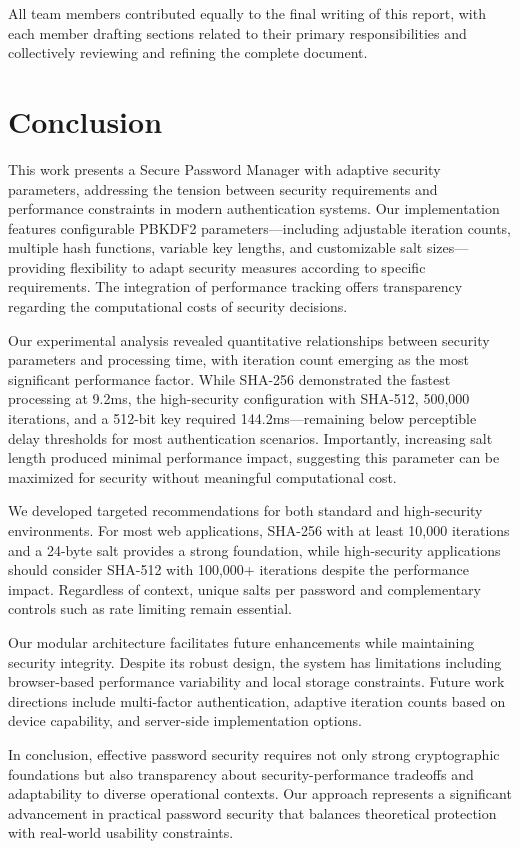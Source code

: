 \documentclass[11pt,a4paper]{article}
\begin{document}
All team members contributed equally to the final writing of this report, with each member drafting sections related to their primary responsibilities and collectively reviewing and refining the complete document.

\section{Conclusion}
This work presents a Secure Password Manager with adaptive security parameters, addressing the tension between security requirements and performance constraints in modern authentication systems. Our implementation features configurable PBKDF2 parameters—including adjustable iteration counts, multiple hash functions, variable key lengths, and customizable salt sizes—providing flexibility to adapt security measures according to specific requirements. The integration of performance tracking offers transparency regarding the computational costs of security decisions.

Our experimental analysis revealed quantitative relationships between security parameters and processing time, with iteration count emerging as the most significant performance factor. While SHA-256 demonstrated the fastest processing at 9.2ms, the high-security configuration with SHA-512, 500,000 iterations, and a 512-bit key required 144.2ms—remaining below perceptible delay thresholds for most authentication scenarios. Importantly, increasing salt length produced minimal performance impact, suggesting this parameter can be maximized for security without meaningful computational cost.

We developed targeted recommendations for both standard and high-security environments. For most web applications, SHA-256 with at least 10,000 iterations and a 24-byte salt provides a strong foundation, while high-security applications should consider SHA-512 with 100,000+ iterations despite the performance impact. Regardless of context, unique salts per password and complementary controls such as rate limiting remain essential.

Our modular architecture facilitates future enhancements while maintaining security integrity. Despite its robust design, the system has limitations including browser-based performance variability and local storage constraints. Future work directions include multi-factor authentication, adaptive iteration counts based on device capability, and server-side implementation options.

In conclusion, effective password security requires not only strong cryptographic foundations but also transparency about security-performance tradeoffs and adaptability to diverse operational contexts. Our approach represents a significant advancement in practical password security that balances theoretical protection with real-world usability constraints.
\end{document}
